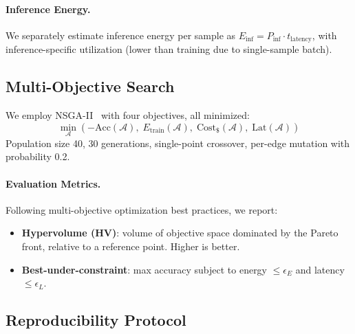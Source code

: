 \documentclass[10pt,twocolumn,letterpaper]{article}
\begin{document}
\paragraph{Inference Energy.}
We separately estimate inference energy per sample as $E_{\text{inf}} = P_{\text{inf}} \cdot t_{\text{latency}}$, with inference-specific utilization (lower than training due to single-sample batch).

\subsection{Multi-Objective Search}

We employ NSGA-II~\cite{deb2002nsga2} with four objectives, all minimized:
\begin{equation}
\min_{\mathcal{A}} \left( -\text{Acc}(\mathcal{A}), \; E_{\text{train}}(\mathcal{A}), \; \text{Cost}_{\$}(\mathcal{A}), \; \text{Lat}(\mathcal{A}) \right)
\end{equation}
Population size 40, 30 generations, single-point crossover, per-edge mutation with probability 0.2.

\paragraph{Evaluation Metrics.}
Following multi-objective optimization best practices, we report:
\begin{itemize}[leftmargin=*,nosep]
\item \textbf{Hypervolume (HV)}: volume of objective space dominated by the Pareto front, relative to a reference point. Higher is better.
\item \textbf{Best-under-constraint}: max accuracy subject to energy $\leq \epsilon_E$ and latency $\leq \epsilon_L$.
\end{itemize}

\subsection{Reproducibility Protocol}

\noindent{}
\end{document}
